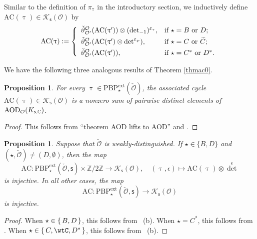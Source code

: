 \documentclass[12pt,a4paper]{amsart}
\def\abs#1{\left|{#1}\right|}
\newcommand{\CK}{{\mathcal {K}}}
\newcommand{\CO}{{\mathcal {O}}}
\newcommand{\g}{\mathfrak g}
\newcommand{\Z}{\mathbb{Z}}
\numberwithin{equation}{section}
\newtheorem{prop}[thm]{Proposition}
\theoremstyle{remark}
\def\PBPe{\mathrm{PBP}^{\mathrm{ext}}}
\begin{document}


Similar to the definition of $\pi_\uptau$ in the introductory section, we inductively define
$\mathrm{AC}(\uptau)\in \CK_{\mathsf s}(\CO) $ by
 \[
   \mathrm{AC}(\uptau):=\left\{
     \begin{array}{ll}
         \check \vartheta_{\CO'}^{\CO}(\mathrm{AC}(\uptau'))\otimes ({\det}_{-1})^{\varepsilon_{\tau}}, &\hbox{if  $\star=B$ or $D$}; \smallskip\\
         \check \vartheta_{\CO'}^{\CO}(\mathrm{AC}(\uptau')\otimes \det^{\varepsilon_{\wp}}), &\hbox{if $\star=C$ or $\widetilde C$};\smallskip \\
              \check \vartheta_{\CO'}^{\CO}(\mathrm{AC}(\uptau')), &\hbox{if $\star=C^*$ or $D^*$}. \\
            \end{array}
   \right.
 \]

We have the following three analogous results of Theorem \ref{thmac0}.


\begin{prop}\label{thmac1}
 For every $\uptau\in \PBPe_\star(\check \CO)$,  the associated cycle $\mathrm{AC}(\uptau)\in \CK_{\mathsf s}(\CO)$ is a nonzero  sum of  pairwise distinct elements of $\mathrm{AOD}_{\CO}(K_{\mathsf s, \C})$.
\end{prop}
\begin{proof}
  This follows from ``theorem AOD lifts to AOD'' and .
\end{proof}


\begin{prop}\label{thmac2}
Suppose that  $\check \CO$ is weakly-distinguished.  If $\star\in \{B,D\}$ and $(\star, \check \CO)\neq (D, \emptyset)$, then  the map
\[
\mathrm{AC}: \PBPe_\star(\check \CO,\mathsf s)\times \Z/2\Z \rightarrow  \CK_{\mathsf s}(\CO),\quad (\uptau, \epsilon)\mapsto \mathrm{AC}(\uptau)\otimes {\det}^{\epsilon}
\]
is injective. In all other cases, the
map
\[
\mathrm{AC}: \PBPe_\star(\check \CO,\mathsf s)\rightarrow  \CK_{\mathsf s}(\CO)
\]
is injective.
\end{prop}
\begin{proof}
When $\star\in \set{B,D}$, this follows from ~(b).
When $\star = C^{*}$, this follows from .
When $\star\in \set{C,\wtC,D^{*}}$, this follows from ~(b).
\end{proof}
\end{document}
